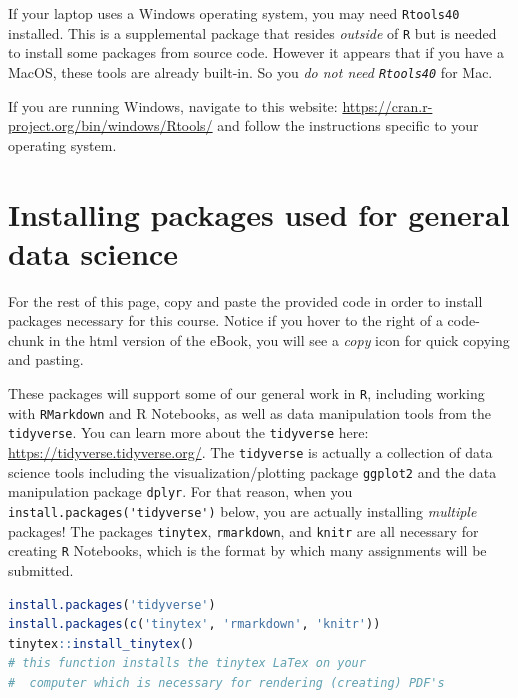 \documentclass[
]{book}
\newcommand{\passthrough}[1]{#1}
\begin{document}
If your laptop uses a Windows operating system, you may need \passthrough{\lstinline!Rtools40!} installed. This is a supplemental package that resides \emph{outside} of \passthrough{\lstinline!R!} but is needed to install some packages from source code. However it appears that if you have a MacOS, these tools are already built-in. So you \emph{do not need \passthrough{\lstinline!Rtools40!}} for Mac.

If you are running Windows, navigate to this website: \url{https://cran.r-project.org/bin/windows/Rtools/} and follow the instructions specific to your operating system.

\hypertarget{installing-packages-used-for-general-data-science}{%
\section*{Installing packages used for general data science}\label{installing-packages-used-for-general-data-science}}

For the rest of this page, copy and paste the provided code in order to install packages necessary for this course. Notice if you hover to the right of a code-chunk in the html version of the eBook, you will see a \emph{copy} icon for quick copying and pasting.

These packages will support some of our general work in \passthrough{\lstinline!R!}, including working with \passthrough{\lstinline!RMarkdown!} and R Notebooks, as well as data manipulation tools from the \passthrough{\lstinline!tidyverse!}. You can learn more about the \passthrough{\lstinline!tidyverse!} here: \url{https://tidyverse.tidyverse.org/}. The \passthrough{\lstinline!tidyverse!} is actually a collection of data science tools including the visualization/plotting package \passthrough{\lstinline!ggplot2!} and the data manipulation package \passthrough{\lstinline!dplyr!}. For that reason, when you \passthrough{\lstinline!install.packages('tidyverse')!} below, you are actually installing \emph{multiple} packages! The packages \passthrough{\lstinline!tinytex!}, \passthrough{\lstinline!rmarkdown!}, and \passthrough{\lstinline!knitr!} are all necessary for creating \passthrough{\lstinline!R!} Notebooks, which is the format by which many assignments will be submitted.

\begin{lstlisting}[language=R]
install.packages('tidyverse')   
install.packages(c('tinytex', 'rmarkdown', 'knitr')) 
tinytex::install_tinytex()  
# this function installs the tinytex LaTex on your
#  computer which is necessary for rendering (creating) PDF's 
\end{lstlisting}
\end{document}
